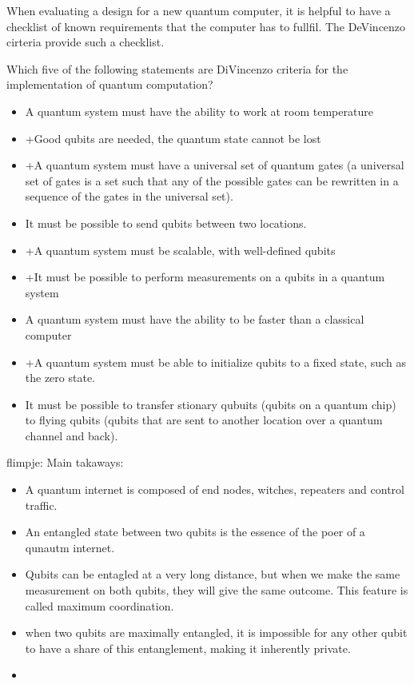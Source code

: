 \documentclass[../../main.tex]{subfiles}
\begin{document}
{When evaluating a design for a new quantum computer, it is helpful to have a checklist of known requirements that the computer has to fullfil. The DeVincenzo cirteria provide such a checklist.

Which five of the following statements are DiVincenzo criteria for the implementation of quantum computation?
\begin{itemize}[nosep]
\item A quantum system must have the ability to work at room temperature
\item +Good qubits are needed, the quantum state cannot be lost
\item +A quantum system must have a universal set of quantum gates (a universal set of gates is a set such that any of the possible gates can be rewritten in a sequence of the gates in the universal set).
\item It must be possible to send qubits between two locations.
\item +A quantum system must be scalable, with well-defined qubits
\item +It must be possible to perform measurements on a qubits in a quantum system
\item A quantum system must have the ability to be faster than a classical computer
\item +A quantum system must be able to initialize qubits to a fixed state, such as the zero state.
\item It must be possible to transfer stionary qubuits (qubits on a quantum chip) to flying qubits (qubits that are sent to another location over a quantum channel and back). 
\end{itemize}

flimpje: Main takaways:
\begin{itemize}
\item A quantum internet is composed of end nodes, witches, repeaters and control traffic.
\item An entangled state between two qubits is the essence of the poer of a qunautm internet.
\item Qubits can be entagled at a very long distance, but when we make the same measurement on both qubits, they will give the same outcome. This feature is called maximum coordination.
\item when two qubits are maximally entangled, it is impossible for any other qubit to have a share of this entanglement, making it inherently private.
\item 
\end{itemize}

}
\end{document}

